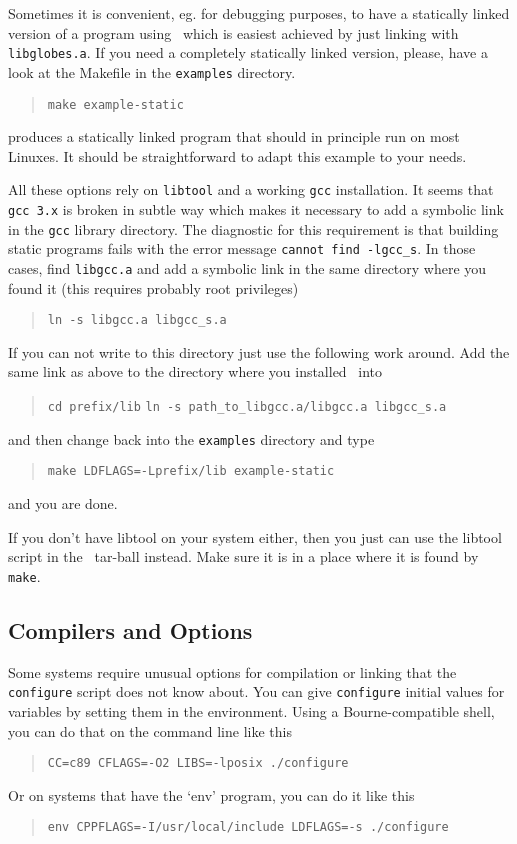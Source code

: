 \begin{appendix}
   Sometimes it is convenient, eg. for debugging purposes, to have a statically
linked version of a program using \GLOBES\, which is easiest achieved by just linking
with \verb+libglobes.a+. If you need a completely statically linked version, please, have
a look at the Makefile in the \verb+examples+ directory.
\begin{quote}
\verb#make example-static#
\end{quote}
produces a statically linked program that should in principle run on most Linuxes.
It should be straightforward to adapt this example to your needs.

All these options rely on \verb+libtool+ and a working \verb`gcc` installation. It seems that \verb`gcc 3.x`
is broken in subtle way which makes it necessary to add a symbolic link in the \verb`gcc` library
directory. The diagnostic for this requirement is that building static programs fails with
the error message \verb+cannot find -lgcc_s+. In those cases, find \verb+libgcc.a+ and add a symbolic 
link in the same directory where you found it (this requires probably root privileges)
\begin{quote}
\verb#ln -s libgcc.a libgcc_s.a#
\end{quote}

If you can not write to this directory just use the following work around. Add the same link  
as above to the directory where you installed \GLOBES\ into
\begin{quote}
\verb#cd prefix/lib#
\verb#ln -s path_to_libgcc.a/libgcc.a libgcc_s.a#
\end{quote}
and then change back into the \verb+examples+ directory and type
\begin{quote}
\verb#make LDFLAGS=-Lprefix/lib example-static#
\end{quote}
and you are done.

If you don't have libtool on your system either, then you just can use the libtool script in
the \GLOBES\ tar-ball instead. Make sure it is in a place where it is found by \verb+make+.



\subsection*{Compilers and Options}


   Some systems require unusual options for compilation or linking that
the \verb+configure+ script does not know about.  You can give \verb+configure+
initial values for variables by setting them in the environment.  Using
a Bourne-compatible shell, you can do that on the command line like
this
\begin{quote}
\verb+CC=c89 CFLAGS=-O2 LIBS=-lposix ./configure+
\end{quote}
Or on systems that have the `env' program, you can do it like this
\begin{quote}
\verb+env CPPFLAGS=-I/usr/local/include LDFLAGS=-s ./configure+
\end{quote}


\end{appendix}
